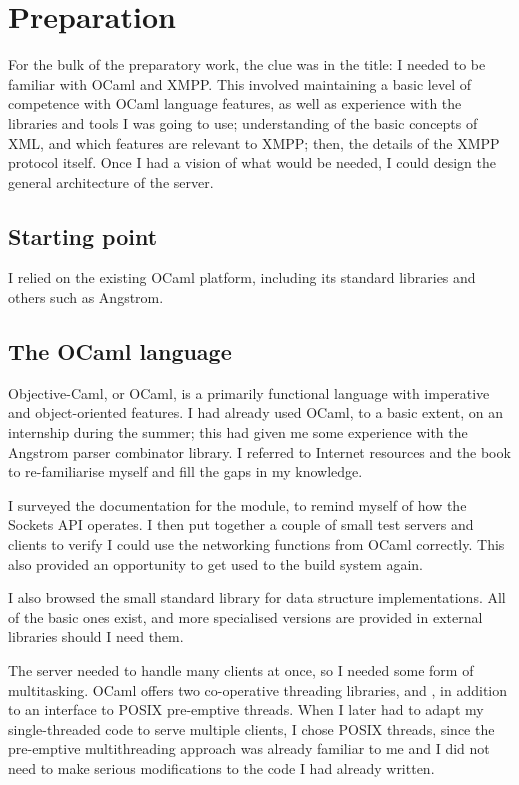 \chapter{Preparation}
For the bulk of the preparatory work, the clue was in the title: I needed to be familiar with OCaml and XMPP. This involved maintaining a basic level of competence with OCaml language features, as well as experience with the libraries and tools I was going to use; understanding of the basic concepts of XML, and which features are relevant to XMPP; then, the details of the XMPP protocol itself. Once I had a vision of what would be needed, I could design the general architecture of the server.

\section{Starting point}
I relied on the existing OCaml platform, including its standard libraries and others such as Angstrom.

\section{The OCaml language}
Objective-Caml, or OCaml, is a primarily functional language with imperative and object-oriented features. I had already used OCaml, to a basic extent, on an internship during the summer; this had given me some experience with the Angstrom parser combinator library. I referred to Internet resources and the  book to re-familiarise myself and fill the gaps in my knowledge.

I surveyed the documentation for the  module, to remind myself of how the Sockets API operates. I then put together a couple of small test servers and clients to verify I could use the networking functions from OCaml correctly. This also provided an opportunity to get used to the build system again.

I also browsed the small standard library for data structure implementations. All of the basic ones exist, and more specialised versions are provided in external libraries should I need them.

The server needed to handle many clients at once, so I needed some form of multitasking. OCaml offers two co-operative threading libraries,  and , in addition to an interface to POSIX pre-emptive threads. When I later had to adapt my single-threaded code to serve multiple clients, I chose POSIX threads, since the pre-emptive multithreading approach was already familiar to me and I did not need to make serious modifications to the code I had already written.


